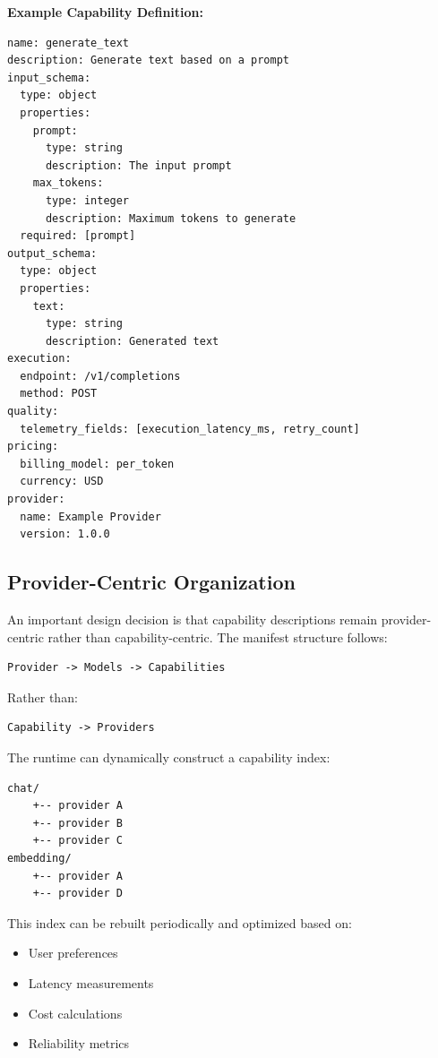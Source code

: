 \textbf{Example Capability Definition:}

\begin{lstlisting}[style=yamlstyle]
name: generate_text
description: Generate text based on a prompt
input_schema:
  type: object
  properties:
    prompt:
      type: string
      description: The input prompt
    max_tokens:
      type: integer
      description: Maximum tokens to generate
  required: [prompt]
output_schema:
  type: object
  properties:
    text:
      type: string
      description: Generated text
execution:
  endpoint: /v1/completions
  method: POST
quality:
  telemetry_fields: [execution_latency_ms, retry_count]
pricing:
  billing_model: per_token
  currency: USD
provider:
  name: Example Provider
  version: 1.0.0
\end{lstlisting}

\subsection{Provider-Centric Organization}

An important design decision is that capability descriptions remain provider-centric rather than capability-centric. The manifest structure follows:

\begin{verbatim}
Provider -> Models -> Capabilities
\end{verbatim}

Rather than:

\begin{verbatim}
Capability -> Providers
\end{verbatim}

The runtime can dynamically construct a capability index:

\begin{verbatim}
chat/
    +-- provider A
    +-- provider B
    +-- provider C
embedding/
    +-- provider A
    +-- provider D
\end{verbatim}

This index can be rebuilt periodically and optimized based on:
\begin{itemize}
    \item User preferences
    \item Latency measurements
    \item Cost calculations
    \item Reliability metrics
\end{itemize}
